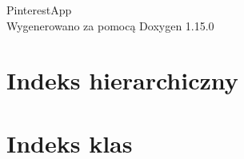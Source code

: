 \documentclass[twoside]{book}
\newcommand{\+}{\discretionary{\mbox{\scriptsize$\hookleftarrow$}}{}{}}
\newcommand{\clearemptydoublepage}{%
    \newpage{\pagestyle{empty}\cleardoublepage}%
  }
\begin{document}
  \raggedbottom
    \hypersetup{pageanchor=false,
                bookmarksnumbered=true,
                pdfencoding=unicode
               }
  \begin{titlepage}
  \vspace*{7cm}
  \begin{center}%
  {\Large Pinterest\+App}\\
  \vspace*{1cm}
  {\large Wygenerowano za pomocą Doxygen 1.15.0}\\
  \end{center}
  \end{titlepage}
  \clearemptydoublepage
  \tableofcontents
  \clearemptydoublepage
  \hypersetup{pageanchor=true}
\chapter{Indeks hierarchiczny}

\chapter{Indeks klas}

\end{document}
